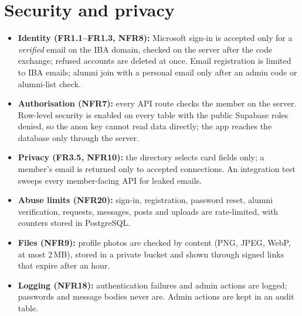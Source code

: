 \documentclass[10pt,a4paper]{article}
\begin{document}
\section{Security and privacy}
\begin{itemize}
\item \textbf{Identity (FR1.1--FR1.3, NFR8):} Microsoft sign-in is accepted only for a \emph{verified} email on the IBA domain, checked on the server after the code exchange; refused accounts are deleted at once. Email registration is limited to IBA emails; alumni join with a personal email only after an admin code or alumni-list check.
\item \textbf{Authorisation (NFR7):} every API route checks the member on the server. Row-level security is enabled on every table with the public Supabase roles denied, so the anon key cannot read data directly; the app reaches the database only through the server.
\item \textbf{Privacy (FR3.5, NFR10):} the directory selects card fields only; a member's email is returned only to accepted connections. An integration test sweeps every member-facing API for leaked emails.
\item \textbf{Abuse limits (NFR20):} sign-in, registration, password reset, alumni verification, requests, messages, posts and uploads are rate-limited, with counters stored in PostgreSQL.
\item \textbf{Files (NFR9):} profile photos are checked by content (PNG, JPEG, WebP, at most 2\,MB), stored in a private bucket and shown through signed links that expire after an hour.
\item \textbf{Logging (NFR18):} authentication failures and admin actions are logged; passwords and message bodies never are. Admin actions are kept in an audit table.
\end{itemize}
\end{document}
